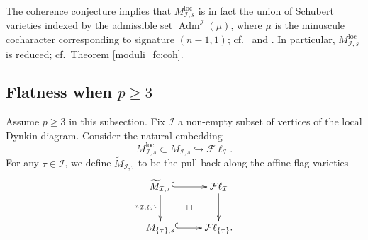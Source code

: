 \documentclass[pdflatex,sn-mathphys-num]{sn-jnl}%
\theoremstyle{thmstyleone}%
\theoremstyle{thmstyletwo}%
\numberwithin{equation}{subsection}
\theoremstyle{thmstylethree}%
\newcommand{\CI}{\ensuremath{\mathcal{I}}\xspace}
\newcommand{\loc}{\ensuremath{\mathrm{loc}}\xspace}
\newcommand{\wt}{\widetilde}
\DeclareMathOperator{\Adm}{\text{Adm}}
\newcommand{\Fl}{\mathcal{F}\ell}
\begin{document}
The coherence conjecture implies that $M^\loc_{\CI,s}$ is in fact the union of Schubert varieties indexed by the admissible set $\Adm^\CI(\mu)$, where $\mu$ is the minuscule cocharacter corresponding to signature $(n-1,1)$; cf.\ \cite[Theorem 11.3]{PR2008} and \cite[Theorem 8.1]{Zhu2014}. In particular, $M_{\CI,s}^\loc$ is reduced; cf.\ Theorem \ref{moduli_fc:coh}.


\subsection{Flatness when $p\geq 3$}\label{general_split-case}	
Assume $p\geq 3$ in this subsection.
Fix $\CI$ a non-empty subset of vertices of the local Dynkin diagram. Consider the natural embedding
\begin{equation}\label{general_pull-back}
	M_{\CI,s}^\loc\subset M_{\CI,s}\hookrightarrow\Fl_\CI.
\end{equation}
For any $\tau\in \CI$, we define $\wt{M}_{\CI,\tau}$ to be the pull-back along the affine flag varieties
\begin{equation*}
\begin{aligned}
\xymatrix{
\wt{M}_{\CI,\tau}\ar@{}[rd]|{\square}\ar@{^(->}[r]\ar[d]_{\pi_{\CI,\{j\}}}&\Fl_\CI\ar[d]\\
M_{\{\tau\},s}\ar@{^(->}[r]&\Fl_{\{\tau\}}.
}
\end{aligned}
\end{equation*}
\end{document}
